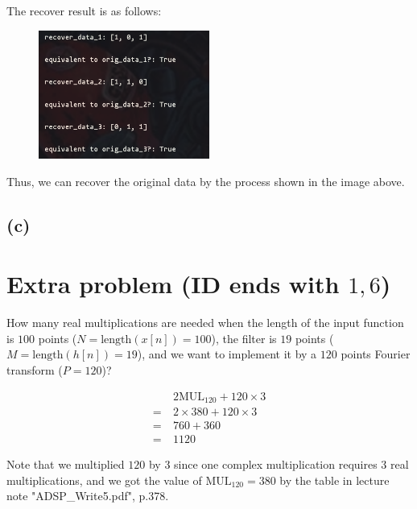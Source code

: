 \documentclass{article}
\begin{document}
The recover result is as follows:

\begin{figure}[H]
    \centering
    \includegraphics[width=0.5\textwidth]{HW5_img/7/recover_result.png}
\end{figure}

Thus, we can recover the original data by the process shown in the image above.

\subsection*{(c)}






\section*{Extra problem (ID ends with $1, 6$)}

How many real multiplications are needed 
when the length of the input function is $100$ points ($N = \mathrm{length}(x[n]) = 100$), 
the filter is $19$ points ($M = \mathrm{length}(h[n]) = 19$), 
and we want to implement it by a $120$ points Fourier transform ($P = 120$)?

\begin{align*}
    &2 \mathrm{MUL}_{120} + 120 \times 3 \\
    = \ & 2 \times 380 + 120 \times 3 \\
    = \ & 760 + 360 \\
    = \ & 1120
\end{align*}

Note that we multiplied $120$ by $3$ since one complex multiplication requires $3$ real multiplications, 
and we got the value of $\mathrm{MUL}_{120} = 380$ by the table in lecture note "ADSP\_Write5.pdf", p.378.
\end{document}
